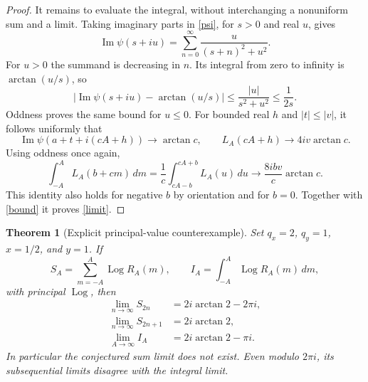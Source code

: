 \documentclass[10pt]{article}
\newtheorem{theorem}{Theorem}
\DeclareMathOperator{\Log}{Log}
\DeclareMathOperator{\Impart}{Im}
\begin{document}
\begin{proof}
It remains to evaluate the integral, without interchanging a
nonuniform sum and a limit. Taking imaginary parts in \eqref{psi},
for $s>0$ and real $u$, gives
\[
 \Impart\psi(s+iu)=\sum_{n=0}^{\infty}
 \frac{u}{(s+n)^2+u^2}.
\]
For $u>0$ the summand is decreasing in $n$. Its integral from zero to
infinity is $\arctan(u/s)$, so
\begin{equation}\label{approx}
 \left|\Impart\psi(s+iu)-\arctan(u/s)\right|
 \le\frac{|u|}{s^2+u^2}\le\frac1{2s}.
\end{equation}
Oddness proves the same bound for $u\le0$.
For bounded real $h$ and $|t|\le|v|$, it follows uniformly that
\[
 \Impart\psi(a+t+i(cA+h))\longrightarrow\arctan c,
 \qquad L_A(cA+h)\longrightarrow4iv\arctan c.
\]
Using oddness once again,
\[
 \int_{-A}^{A}L_A(b+cm)\,dm
 =\frac1c\int_{cA-b}^{cA+b}L_A(u)\,du
 \longrightarrow\frac{8ibv}{c}\arctan c.
\]
This identity also holds for negative $b$ by orientation and for
$b=0$. Together with \eqref{bound} it proves \eqref{limit}.
\end{proof}

\begin{theorem}[Explicit principal-value counterexample]\label{counter}
Set $q_x=2$, $q_y=1$, $x=1/2$, and $y=1$. If
\[
 S_A=\sum_{m=-A}^{A}\Log R_A(m),\qquad
 I_A=\int_{-A}^{A}\Log R_A(m)\,dm,
\]
with principal $\Log$, then
\begin{align*}
 \lim_{n\to\infty}S_{2n}&=2i\arctan2-2\pi i,\\
 \lim_{n\to\infty}S_{2n+1}&=2i\arctan2,\\
 \lim_{A\to\infty}I_A&=2i\arctan2-\pi i.
\end{align*}
In particular the conjectured sum limit does not exist. Even modulo
$2\pi i$, its subsequential limits disagree with the integral limit.
\end{theorem}
\end{document}

